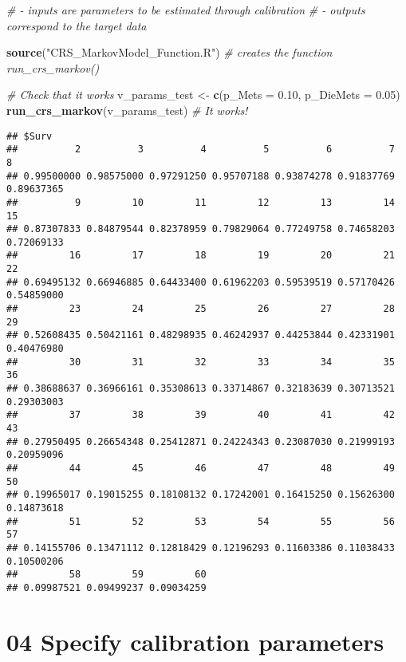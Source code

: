 \documentclass[
]{article}
\newenvironment{Shaded}{\begin{snugshade}}{\end{snugshade}}
\newcommand{\CommentTok}[1]{\textcolor[rgb]{0.56,0.35,0.01}{\textit{#1}}}
\newcommand{\DataTypeTok}[1]{\textcolor[rgb]{0.13,0.29,0.53}{#1}}
\newcommand{\FloatTok}[1]{\textcolor[rgb]{0.00,0.00,0.81}{#1}}
\newcommand{\KeywordTok}[1]{\textcolor[rgb]{0.13,0.29,0.53}{\textbf{#1}}}
\newcommand{\NormalTok}[1]{#1}
\newcommand{\StringTok}[1]{\textcolor[rgb]{0.31,0.60,0.02}{#1}}
\begin{document}
\begin{Shaded}
\begin{Highlighting}[]
\CommentTok{# - inputs are parameters to be estimated through calibration}
\CommentTok{# - outputs correspond to the target data}

\KeywordTok{source}\NormalTok{(}\StringTok{"CRS_MarkovModel_Function.R"}\NormalTok{) }\CommentTok{# creates the function run_crs_markov()}

\CommentTok{# Check that it works}
\NormalTok{v_params_test <-}\StringTok{ }\KeywordTok{c}\NormalTok{(}\DataTypeTok{p_Mets =} \FloatTok{0.10}\NormalTok{, }\DataTypeTok{p_DieMets =} \FloatTok{0.05}\NormalTok{)}
\KeywordTok{run_crs_markov}\NormalTok{(v_params_test) }\CommentTok{# It works!}
\end{Highlighting}
\end{Shaded}

\begin{verbatim}
## $Surv
##          2          3          4          5          6          7          8 
## 0.99500000 0.98575000 0.97291250 0.95707188 0.93874278 0.91837769 0.89637365 
##          9         10         11         12         13         14         15 
## 0.87307833 0.84879544 0.82378959 0.79829064 0.77249758 0.74658203 0.72069133 
##         16         17         18         19         20         21         22 
## 0.69495132 0.66946885 0.64433400 0.61962203 0.59539519 0.57170426 0.54859000 
##         23         24         25         26         27         28         29 
## 0.52608435 0.50421161 0.48298935 0.46242937 0.44253844 0.42331901 0.40476980 
##         30         31         32         33         34         35         36 
## 0.38688637 0.36966161 0.35308613 0.33714867 0.32183639 0.30713521 0.29303003 
##         37         38         39         40         41         42         43 
## 0.27950495 0.26654348 0.25412871 0.24224343 0.23087030 0.21999193 0.20959096 
##         44         45         46         47         48         49         50 
## 0.19965017 0.19015255 0.18108132 0.17242001 0.16415250 0.15626300 0.14873618 
##         51         52         53         54         55         56         57 
## 0.14155706 0.13471112 0.12818429 0.12196293 0.11603386 0.11038433 0.10500206 
##         58         59         60 
## 0.09987521 0.09499237 0.09034259
\end{verbatim}

\hypertarget{specify-calibration-parameters}{%
\section{04 Specify calibration
parameters}\label{specify-calibration-parameters}}
\end{document}
